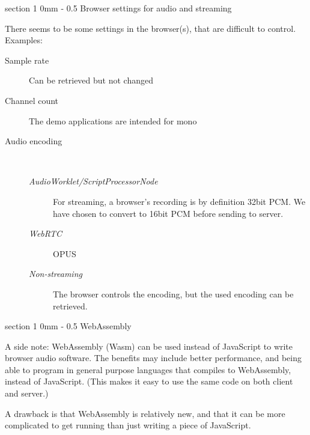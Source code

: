 \documentclass[11pt, a4paper, twoside]{article}
\makeatletter
\renewcommand{\section}{\@startsection
  {section}%
  {1}%
  {0mm}%
  {-\baselineskip}%
  {0.5\baselineskip}%
  {\bfseries\sffamily\Large}}%
\makeatother
\begin{document}
\section{Browser settings for audio and streaming}

There seems to be some settings in the browser(s), that are difficult to control. Examples:

\begin{description}
\item[Sample rate] Can be retrieved but not changed
\item[Channel count] The demo applications are intended for mono
\item[Audio encoding]\ \\[-14pt]
  \begin{description}
  \item[\em{AudioWorklet/ScriptProcessorNode}] For streaming, a browser's recording is by definition 32bit PCM. We have chosen to convert to 16bit PCM before sending to server.
  \item[\em{WebRTC}] OPUS
  \item[\em{ Non-streaming}] The browser controls the encoding, but the used encoding can be retrieved.
    
  \end{description}

\end{description}


\section{WebAssembly}

A side note: WebAssembly (Wasm) can be used instead of JavaScript to
write browser audio software. The benefits may include better
performance, and being able to program in general purpose languages
that compiles to WebAssembly, instead of JavaScript. (This makes it
easy to use the same code on both client and server.)

A drawback is that WebAssembly is relatively new, and that it can be
more complicated to get running than just writing a piece of JavaScript.
\end{document}

